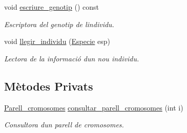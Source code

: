 \begin{DoxyCompactItemize}
void \hyperlink{class_individu_a66e02b3d1a7e327ffb152c1e6193407a}{escriure\+\_\+genotip} () const 
\begin{DoxyCompactList}\small\item\em Escriptora del genotip de l\textquotesingle{}individu. \end{DoxyCompactList}\item 
void \hyperlink{class_individu_ad0f73f2395d08a8d9de8604c2bede4d6}{llegir\+\_\+individu} (\hyperlink{class_especie}{Especie} esp)
\begin{DoxyCompactList}\small\item\em Lectora de la informació d\textquotesingle{}un nou individu. \end{DoxyCompactList}\end{DoxyCompactItemize}
\subsection*{Mètodes Privats}
\begin{DoxyCompactItemize}
\item 
\hyperlink{class_parell__cromosomes}{Parell\+\_\+cromosomes} \hyperlink{class_individu_a1493ec6bfadc929b425bebb0c1a3a9c9}{consultar\+\_\+parell\+\_\+cromosomes} (int i)
\begin{DoxyCompactList}\small\item\em Consultora d\textquotesingle{}un parell de cromosomes. \end{DoxyCompactList}\end{DoxyCompactItemize}
